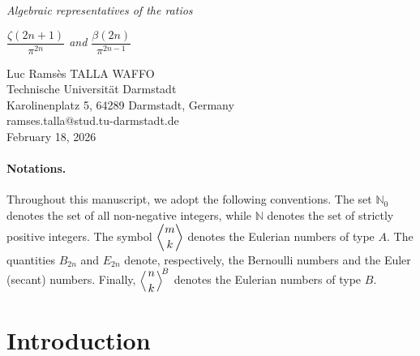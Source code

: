 \documentclass[11pt,twoside]{article}
\newcommand{\HeadTitleTwo}{\begin{center}
\Large{\textit{Algebraic representatives of the ratios}}\end{center} 
\begin{center}
\Large{\textit{$\dfrac{\zeta(2n+1)}{\pi^{2n}}$ and $\dfrac{\beta(2n)}{\pi^{2n-1}}$}}
\end{center}}
\newcommand{\EulerB}[2]{\left\langle {#1 \atop #2} \right\rangle^{\!B}}
\providecommand{\HeadTitleTwo}{} %
\numberwithin{equation}{section}
\begin{document}
\thispagestyle{fancy}

\vspace{0.2cm}

\begin{center}
\Large{\HeadTitleTwo}
\end{center}

\hspace{3cm}

\begin{center}
Luc Ramsès TALLA WAFFO \\
Technische Universität Darmstadt\\
Karolinenplatz 5, 64289 Darmstadt, Germany\\
ramses.talla@stud.tu-darmstadt.de\\
\vspace{0.5cm}
February 18, 2026
\end{center}

 
\begin{abstract}
In \cite{TallaWaffo2025arxiv2511.02843} we introduced even polynomials $\Xi_n, \Lambda_n\in\mathbb{Q}[x]$ arising from integral representations of
$\beta(2n)/\pi^{2n-1}$ and $\zeta(2n+1)/\pi^{2n}$. In this paper we give explicit
closed formulae for these polynomials in terms of Eulerian numbers and study
their structural properties. These properties may prove useful in studying the arithmetic nature of the ratios $\beta(2n)/\pi^{2n}$ and $\zeta(2n+1)/\pi^{2n+1}.$
\end{abstract}

\vspace{0.2cm}

\paragraph{Notations.}
Throughout this manuscript, we adopt the following conventions. The set $\mathbb{N}_0$ denotes the set of all non-negative integers, while $\mathbb{N}$ denotes the set of strictly positive integers. The symbol $\displaystyle \genfrac{\langle}{\rangle}{0pt}{}{m}{k}$ denotes the Eulerian numbers of type $A$. The quantities $B_{2n}$ and $E_{2n}$ denote, respectively, the Bernoulli numbers and the Euler (secant) numbers. Finally, $\displaystyle \EulerB{n}{k}$ denotes the Eulerian numbers of type $B$.

\vspace{0.5cm}

\section*{Introduction}
\end{document}
